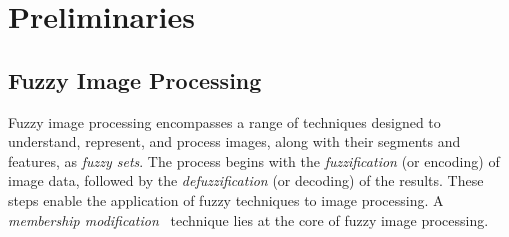 \section{Preliminaries}
\label{section:preliminaries}
\subsection*{Fuzzy Image Processing}

Fuzzy image processing encompasses a range of techniques designed to understand, represent, and process images, along with their segments and features, as {\em fuzzy sets}. 
The process begins with the {\em fuzzification} (or encoding) of image data, followed by the {\em defuzzification} (or decoding) of the results. 
These steps enable the application of fuzzy techniques to image processing. 
A {\em membership modification}~\cite{haussecker2000fuzzy} technique lies at the core of fuzzy image processing.

    



